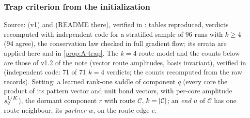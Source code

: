 \subsubsection{Trap criterion from the initialization}\label{app:supp-s2s-trap}
Source:  (v1) and  (README there), verified in
: tables reproduced, verdicts recomputed with independent code for a stratified
sample of 96 runs with $k\ge4$ (94 agree), the conservation law checked in full gradient flow; its errata are applied
here and in \cref{prop:A-trap}. The $k=4$ route model and the counts below are those of v1.2 of the note (vector route
amplitudes, basis invariant), verified in  (independent code: 71 of 71
$k=4$ verdicts; the counts recomputed from the raw records). Setting: a learned rank-one saddle of component $q$ (every core the product of its pattern vector and unit bond
vectors, with per-core amplitude $s_{q}^{1/K}$), the dormant component $r$ with route $\mathcal C$, $k=\lvert\mathcal C\rvert$;
an \emph{end} $u$ of $\mathcal C$ has one route neighbour, its \emph{partner} $w$, on the route edge $e$.

